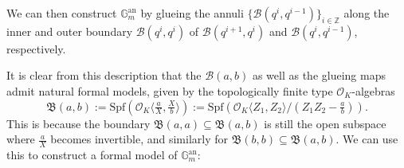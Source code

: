 \documentclass[10pt,oneside]{amsart}
\theoremstyle{definition}
\begin{document}
	We can then construct $\mathbb G_m^{\mathrm{an}}$ by glueing the annuli $\{\mathcal B(q^i,q^{i-1})\}_{i\in\mathbb{Z}}$ along the inner and outer boundary $\mathcal B(q^i,q^i)$ of $\mathcal  B(q^{i+1},q^{i})$ and $\mathcal B(q^{i}, q^{i-1})$, respectively.
	
	It is clear from this description that the $\mathcal B(a,b)$ as well as the glueing maps admit natural formal models, given by the topologically finite type $\mathcal O_K$-algebras
	\[\mathfrak B(a,b):=\mathrm{Spf}(\mathcal O_K\langle \tfrac{a}{X},\tfrac{X}{b} \rangle):=\mathrm{Spf}(\mathcal O_K\langle Z_1,Z_2 \rangle/(Z_1Z_2-\tfrac{a}{b})).\]
	This is because the boundary $\mathfrak B(a,a)\subseteq \mathfrak B(a,b)$ is still the open subspace where $\tfrac{a}{X}$ becomes invertible, and similarly for  $\mathfrak B(b,b)\subseteq \mathfrak B(a,b)$. We can use this to construct a formal model of $\mathbb G_m^{\mathrm{an}}$:
\end{document}
